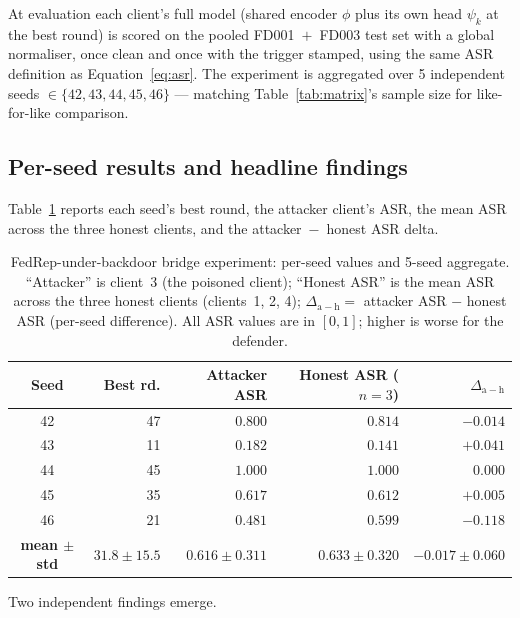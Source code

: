 \documentclass[preprint,12pt,authoryear]{elsarticle}
\begin{document}
At evaluation each client's full model (shared encoder $\phi$ plus
its own head $\psi_k$ at the best round) is scored on the pooled
FD001~$+$~FD003 test set with a global normaliser, once clean and
once with the trigger stamped, using the same ASR definition as
Equation~\ref{eq:asr}. The experiment is aggregated over 5
independent seeds $\in \{42, 43, 44, 45, 46\}$ --- matching
Table~\ref{tab:matrix}'s sample size for like-for-like comparison.

\subsection{Per-seed results and headline findings}
\label{sec:bridge-results}

Table~\ref{tab:bridge} reports each seed's best round, the attacker
client's ASR, the mean ASR across the three honest clients, and the
attacker~$-$~honest ASR delta.

\begin{table}[!ht]
\centering
\footnotesize
\setlength{\tabcolsep}{4pt}
\renewcommand{\arraystretch}{1.15}
\caption{FedRep-under-backdoor bridge experiment: per-seed values
and 5-seed aggregate. ``Attacker'' is client~3 (the poisoned
client); ``Honest ASR'' is the mean ASR across the three honest
clients (clients~1, 2, 4);
$\Delta_{\mathrm{a-h}} = $ attacker ASR $-$ honest ASR (per-seed
difference). All ASR values are in $[0, 1]$; higher is worse for
the defender.}
\label{tab:bridge}
\begin{tabular}{@{}crrrr@{}}
\toprule
Seed & Best rd. & Attacker ASR & Honest ASR ($n{=}3$) & $\Delta_{\mathrm{a-h}}$ \\
\midrule
42 & 47 & $0.800$ & $0.814$ & $-0.014$ \\
43 & 11 & $0.182$ & $0.141$ & $+0.041$ \\
44 & 45 & $1.000$ & $1.000$ & $\phantom{-}0.000$ \\
45 & 35 & $0.617$ & $0.612$ & $+0.005$ \\
46 & 21 & $0.481$ & $0.599$ & $-0.118$ \\
\midrule
\textbf{mean $\pm$ std} & $\mathbf{31.8 \pm 15.5}$ & $\mathbf{0.616 \pm 0.311}$ & $\mathbf{0.633 \pm 0.320}$ & $\mathbf{-0.017 \pm 0.060}$ \\
\bottomrule
\end{tabular}
\end{table}

Two independent findings emerge.
\end{document}
